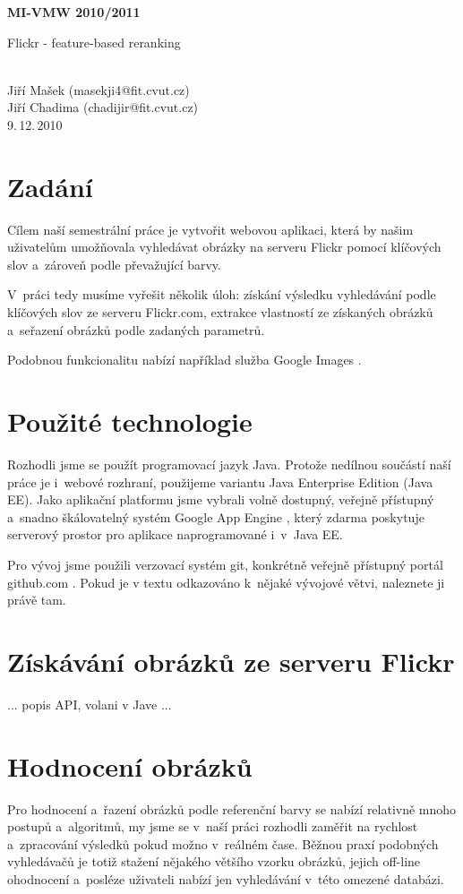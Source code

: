 \documentclass[12pt,oneside,a4paper]{article}
\begin{document}
\begin{center}
\bf MI-VMW 2010/2011\\[2mm]
    \begin{Large}Flickr - feature-based reranking\end{Large}\\[3mm]
       Jiří Mašek (masekji4@fit.cvut.cz)\\
       Jiří Chadima (chadijir@fit.cvut.cz)\\
9.\,12.\,2010
\end{center}

\section{Zadání}
Cílem naší semestrální práce je vytvořit webovou aplikaci, která by našim uživatelům umožňovala vyhledávat obrázky na serveru Flickr \cite{flickr} pomocí klíčových slov a~zároveň podle převažující barvy.

V~práci tedy musíme vyřešit několik úloh: získání výsledku vyhledávání podle klíčových slov ze serveru Flickr.com, extrakce vlastností ze získaných obrázků a~seřazení obrázků podle zadaných parametrů.

Podobnou funkcionalitu nabízí například služba Google Images \cite{GoogleImages}.

\section{Použité technologie}

Rozhodli jsme se použít programovací jazyk Java. Protože nedílnou součástí naší práce je i~webové rozhraní, použijeme variantu Java Enterprise Edition (Java EE). Jako aplikační platformu jsme vybrali volně dostupný, veřejně přístupný a~snadno škálovatelný systém Google App Engine \cite{GoogleAE}, který zdarma poskytuje serverový prostor pro aplikace naprogramované i~v~Java EE.

Pro vývoj jsme použili verzovací systém git, konkrétně veřejně přístupný portál github.com \cite{official}. Pokud je v textu odkazováno k~nějaké vývojové větvi, naleznete ji právě tam.

\section{Získávání obrázků ze serveru Flickr}

... popis API, volani v Jave ...

\section{Hodnocení obrázků}
Pro hodnocení a~řazení obrázků podle referenční barvy se nabízí relativně mnoho postupů a~algoritmů, my jsme se v~naší práci rozhodli zaměřit na rychlost a~zpracování výsledků pokud možno v~reálném čase. Běžnou praxí podobných vyhledávačů je totiž stažení nějakého většího vzorku obrázků, jejich off-line ohodnocení a~posléze uživateli nabízí jen vyhledávání v~této omezené databázi.
\end{document}
